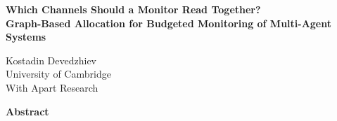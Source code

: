\documentclass[11pt]{article}
\begin{document}
\begin{center}
{\Large\bfseries Which Channels Should a Monitor Read Together?\\[3pt]
Graph-Based Allocation for Budgeted Monitoring of Multi-Agent Systems\par}
\vspace{14pt}
Kostadin Devedzhiev\\
University of Cambridge\\[6pt]
With Apart Research\\[14pt]
{\bfseries Abstract\par}
\end{center}
\vspace{2pt}
\begin{list}{}{\textwidth{}\textwidth\topsep=0pt}\item[]\small

\end{list}
\vspace{4pt}






\clearpage
\appendix
{}

\end{document}
